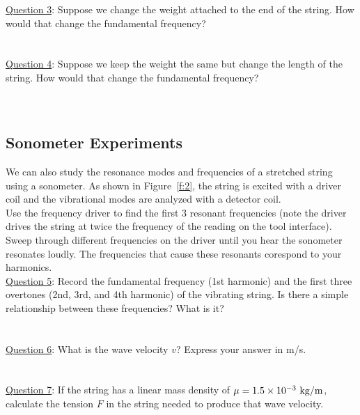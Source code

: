 \documentclass[11pt]{NSF}
\begin{document}
\underline{Question 3}: Suppose we change the weight attached to the end of 
the string.
How would that change the fundamental frequency?
\\
\\
\\

\underline{Question 4}: Suppose we keep the weight the same but change
the length of the string.
How would that change the fundamental frequency?
\\
\\
\\

\subsection{Sonometer Experiments}

We can also study the resonance modes and frequencies of a 
stretched string using a sonometer.
As shown in Figure~\ref{f:2}, 
the string is excited with a driver coil 
and the vibrational modes are analyzed with a detector coil. \\

Use the frequency driver to find the first 3 resonant frequencies (note the driver drives the string at twice the frequency of the reading on the tool interface). Sweep through different frequencies on the driver until you hear the sonometer resonates loudly. The frequencies that cause these resonants corespond to your harmonics. \\

\underline{Question 5}: Record the fundamental frequency (1st harmonic)
and the first three overtones (2nd, 3rd, and 4th harmonic) of the vibrating
string.
Is there a simple relationship between these frequencies? What is it? \\
\\
\\

\underline{Question 6}: What is the wave velocity $v$?
Express your answer in m/s. \\
\\
\\

\underline{Question 7}: If the string has a linear mass density of $\mu = 1.5\times 10^{-3}~{\rm kg/m}$,
calculate the tension $F$ in the string needed to 
produce that wave velocity. \\
\\
\\
\end{document}
